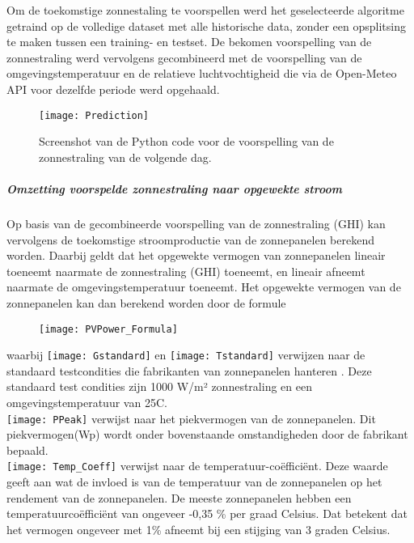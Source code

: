 Om de toekomstige zonnestaling te voorspellen werd het geselecteerde algoritme getraind op de volledige dataset met alle historische data, zonder een opsplitsing te maken tussen een training- en testset. De bekomen voorspelling van de zonnestraling werd vervolgens gecombineerd met de voorspelling van de omgevingstemperatuur en de relatieve luchtvochtigheid die via de Open-Meteo API voor dezelfde periode werd opgehaald. 

\begin{figure}[h!]
    \centering\texttt{[image: Prediction]}
    \caption{\label{fig:Prediction}Screenshot van de Python code voor de voorspelling van de zonnestraling van de volgende dag.}
\end{figure} 

\newpage
\subparagraph{Omzetting voorspelde zonnestraling naar opgewekte stroom}

Op basis van de gecombineerde voorspelling van de zonnestraling (GHI) kan vervolgens de toekomstige stroomproductie van de zonnepanelen berekend worden. Daarbij geldt dat het opgewekte vermogen van zonnepanelen lineair toeneemt naarmate de zonnestraling (GHI) toeneemt, en lineair afneemt naarmate de omgevingstemperatuur toeneemt. Het opgewekte vermogen van de zonnepanelen kan dan berekend worden door de formule

\begin{figure}[h!]
    \centering\texttt{[image: PVPower\_Formula]}
\end{figure} 

waarbij \texttt{[image: Gstandard]} en \texttt{[image: Tstandard]} verwijzen naar de standaard testcondities die fabrikanten van zonnepanelen hanteren \autocite{Kazem2017}. Deze standaard test condities zijn 1000 W/m² zonnestraling en een omgevingstemperatuur van 25\textdegree C. \\ 

\texttt{[image: PPeak]} verwijst naar het piekvermogen van de zonnepanelen. Dit piekvermogen(Wp) wordt onder bovenstaande omstandigheden door de fabrikant bepaald. \\

\texttt{[image: Temp\_Coeff]} verwijst naar de temperatuur-coëfficiënt. Deze waarde geeft aan wat de invloed is van de temperatuur van de zonnepanelen op het rendement van de zonnepanelen. De meeste zonnepanelen hebben een temperatuurcoëfficiënt van ongeveer -0,35 \% per graad Celsius. Dat betekent dat het vermogen ongeveer met 1\% afneemt bij een stijging van 3 graden Celsius. \\


